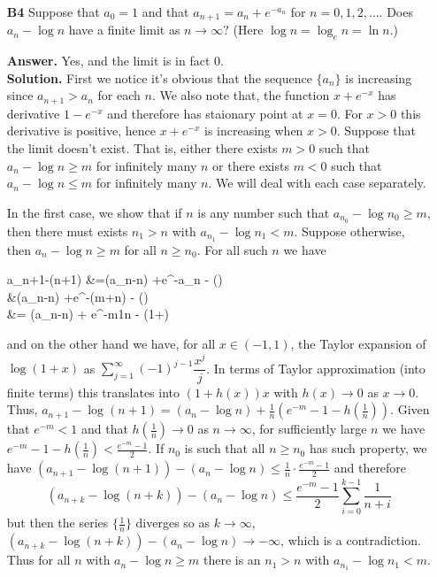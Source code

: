 \documentclass[11pt,a4paper]{article}
\newcommand{\<}{\langle}
\renewcommand{\>}{\rangle}
\begin{document}
\begin{enumerate}
	\item[\textbf{B4}] Suppose that $a_0=1$ and that $a_{n+1}=a_n+e^{-a_n}$ for $n=0,1,2,\dots.$ Does $a_n-\log n$ have a finite limit as $n\to\infty?$ (Here $\log n=\log_en=\ln n.$)
	
	\textbf{Answer.} Yes, and the limit is in fact 0. \\
	\textbf{Solution.} First we notice it's obvious that the sequence $\{a_n\}$ is increasing since $a_{n+1}>a_n$ for each $n$. 
	We also note that, the function $x+e^{-x}$ has derivative $1-e^{-x}$ and therefore has staionary point at $x=0$. For $x>0$ this derivative is positive, hence $x+e^{-x}$ is increasing when $x>0$. 
	Suppose that the limit doesn't exist. That is, either there exists $m>0$ such that $a_n-\log n\ge m$ for infinitely many $n$ or there exists $m<0$ such that $a_n-\log n\le m$ for infinitely many $n$. We will deal with each case separately. 
	
	In the first case, we show that if $n$ is any number such that $a_{n_0}-\log {n_0}\ge m$, then there must exists $n_1>n$ with $a_{n_1}-\log {n_1}< m$. Suppose otherwise, then $a_n-\log n\ge m$ for all $n\ge n_0$. For all such $n$ we have 
	\begin{flalign*}
	a_{n+1}-\log (n+1)
	&=(a_n-\log n) +e^{-a_n} - \log\left(\right)
	\\&\le (a_n-\log n) +e^{-(m+\log n)} - \log\left(\right)
	\\&= (a_n-\log n) + e^{-m}\cdot\frac 1n - \log\left(1+\right)
	\end{flalign*}
	and on the other hand we have, for all $x\in (-1, 1)$, the Taylor expansion of $\log (1+x)$ as $\displaystyle\sum_{j=1}^{\infty} (-1)^{j-1}\dfrac{x^j}{j}$. In terms of Taylor approximation (into finite terms) this translates into $(1+h(x))x$ with $h(x)\to 0$ as $x\to 0$. Thus, 
	$a_{n+1}-\log (n+1)= (a_n-\log n)+\frac1n (e^{-m}-1 - h(\frac 1n))$. 
	Given that $e^{-m}<1$ and that $h(\frac 1n)\to 0$ as $n\to \infty$, for sufficiently large $n$ we have 
	$e^{-m}-1 - h(\frac 1n) < \frac{e^{-m}-1}{2}$. 
	If $n_0$ is such that all $n\ge n_0$ has such property, we have $(a_{n+1}-\log (n+1)) - (a_n - \log n) \le \frac 1n \cdot \frac{e^{-m}-1}{2}$ and therefore 
	\[
	(a_{n+k}-\log (n+k)) - (a_n - \log n) \le \frac{e^{-m}-1}{2}\sum_{i=0}^{k-1}\frac{1}{n+i}
	\]
	but then the series $\{\frac 1n\}$ diverges so as $k\to\infty$, $(a_{n+k}-\log (n+k)) - (a_n - \log n)\to -\infty$, which is a contradiction. Thus for all $n$ with $a_n-\log n\ge m$ there is an $n_1>n$ with $a_{n_1}-\log n_1 < m$. 
	

\end{enumerate}
\end{document}
